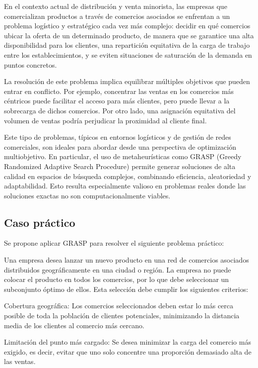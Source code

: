 \documentclass[12pt,a4paper]{book}
\begin{document}
En el contexto actual de distribución y venta minorista, las empresas que comercializan productos a través de comercios asociados se enfrentan a un problema logístico y estratégico cada vez más complejo: decidir en qué comercios ubicar la oferta de un determinado producto, de manera que se garantice una alta disponibilidad para los clientes, una repartición equitativa de la carga de trabajo entre los establecimientos, y se eviten situaciones de saturación de la demanda en puntos concretos.

La resolución de este problema implica equilibrar múltiples objetivos que pueden entrar en conflicto. Por ejemplo, concentrar las ventas en los comercios más céntricos puede facilitar el acceso para más clientes, pero puede llevar a la sobrecarga de dichos comercios. Por otro lado, una asignación equitativa del volumen de ventas podría perjudicar la proximidad al cliente final.

Este tipo de problemas, típicos en entornos logísticos y de gestión de redes comerciales, son ideales para abordar desde una perspectiva de optimización multiobjetivo. En particular, el uso de metaheurísticas como GRASP (Greedy Randomized Adaptive Search Procedure) permite generar soluciones de alta calidad en espacios de búsqueda complejos, combinando eficiencia, aleatoriedad y adaptabilidad. Esto resulta especialmente valioso en problemas reales donde las soluciones exactas no son computacionalmente viables.

\subsection{Caso práctico}

Se propone aplicar GRASP para resolver el siguiente problema práctico:

Una empresa desea lanzar un nuevo producto en una red de comercios asociados distribuidos geográficamente en una ciudad o región. La empresa no puede colocar el producto en todos los comercios, por lo que debe seleccionar un subconjunto óptimo de ellos. Esta selección debe cumplir los siguientes criterios:

Cobertura geográfica: Los comercios seleccionados deben estar lo más cerca posible de toda la población de clientes potenciales, minimizando la distancia media de los clientes al comercio más cercano.

Limitación del punto más cargado: Se desea minimizar la carga del comercio más exigido, es decir, evitar que uno solo concentre una proporción demasiado alta de las ventas.
\end{document}
